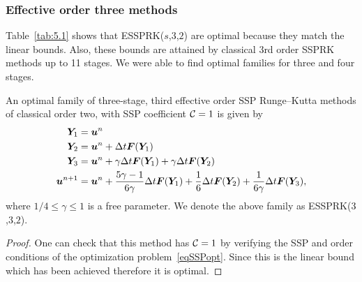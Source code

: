 \subsubsection{Effective order three methods}\label{subsubsection3.4.1}



Table~\ref{tab:5.1} shows that ESSPRK($s$,$3$,$2$) are optimal because they match the linear bounds. Also, these bounds are attained by classical 3rd order SSPRK methods up to 11 stages. We were able to find optimal families for three and four stages.

\begin{theorem}\label{thm:ESSPRK(3,3,2)}
  An optimal family of three-stage, third effective order
  SSP Runge--Kutta methods of classical order two, with SSP
  coefficient $\mathcal{C}=1$ is given by
    \begin{displaymath}
        \begin{split}
            \bm{Y}_{1} &= \bm{u}^{n} \\
            \bm{Y}_{2} &= \bm{u}^{n} + \Delta t\bm{F}(\bm{Y}_{1}) \\
            \bm{Y}_{3} &= \bm{u}^{n} + \gamma\Delta t\bm{F}(\bm{Y}_{1}) + \gamma\Delta t\bm{F}(\bm{Y}_{2}) \\
            \bm{u}^{n+1} &= \bm{u}^{n} + \frac{5\gamma-1}{6\gamma}\Delta t\bm{F}(\bm{Y}_{1}) + \frac{1}{6}\Delta t\bm{F}(\bm{Y}_{2}) + \frac{1}{6\gamma}\Delta t\bm{F}(\bm{Y}_{3}),
        \end{split}
    \end{displaymath}
    where \( 1/4 \leq \gamma \leq 1 \) is a free parameter. We denote the above family as ESSPRK($3$,$3$,$2$).
\end{theorem}

\begin{proof}
One can check that this method has $\mathcal{C} = 1$ by verifying the SSP and order conditions of the optimization problem~\eqref{eqSSPopt}. Since this is the linear bound which has been achieved therefore it is optimal.
\end{proof}

